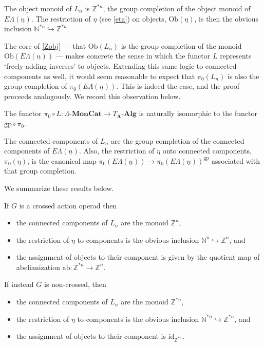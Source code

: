 \documentclass{amsbook} %
\newcommand{\mb}{\mathbf}
\newcommand{\id}{\textrm{id}}
\newcommand{\ML}{\mathbf{\Lambda}}
\newcommand{\ELn}{E\Lambda(\underline{n})}
\newcommand{\lmc}{\Lambda\mbox{-}\mb{MonCat}}
\newcommand{\ab}{\mathrm{ab}}
\newcommand{\gp}{\mathrm{gp}}
\numberwithin{section}{chapter}
\begin{document}
\begin{cor}\label{Zobj}
The object monoid of $L_n$ is $\mathbb{Z}^{*n}$, the group completion of the object monoid of $\ELn$. The restriction of $\eta$ (see \cref{eta}) on objects, $\mathrm{Ob}(\eta)$, is then the obvious inclusion $\mathbb{N}^{*n} \hookrightarrow \mathbb{Z}^{*n}$.
\end{cor}

The core of \cref{Zobj} --- that $\mathrm{Ob}(L_n)$ is the group completion of the monoid $\mathrm{Ob}(\ELn)$ --- makes concrete the sense in which the functor $L$ represents `freely adding inverses' to objects. Extending this same logic to connected components as well, it would seem reasonable to expect that $\pi_0(L_n)$ is also the group completion of $\pi_0(\ELn)$. This is indeed the case, and the proof proceeds analogously. We record this observation below. 

\begin{prop}\label{pilel_gppiel}
The functor $\pi_0 \circ L \colon  \lmc \rightarrow T_{\ML}\mbox{-}\mb{Alg}$ is naturally isomorphic to the functor $\gp \circ \pi_0$.
\end{prop}

\begin{cor}\label{Zconcomp} The connected components of $L_n$ are the group completion of the connected components of $\ELn$. Also, the restriction of $\eta$ onto connected components, $\pi_0(\eta)$, is the canonical map $\pi_0(\ELn) \rightarrow \pi_0(\ELn)^{\gp}$ associated with that group completion.
\end{cor}

We summarize these results below.
\begin{cor}\label{crossconcomp} If $G$ is a crossed action operad then
\begin{itemize} 
\item the connected components of $L_n$ are the monoid $\mathbb{Z}^n$,
\item the restriction of $\eta$ to components is the obvious inclusion $\mathbb{N}^n \hookrightarrow \mathbb{Z}^n$, and
\item the assignment of objects to their component is given by the quotient map of abelianization $\ab \colon  \mathbb{Z}^{\ast n} \rightarrow \mathbb{Z}^n$.
\end{itemize}
If instead $G$ is non-crossed, then
\begin{itemize} \itemsep0em
\item the connected components of $L_n$ are the monoid $\mathbb{Z}^{\ast n}$,
\item the restriction of $\eta$ to components is the obvious inclusion $\mathbb{N}^{\ast n} \hookrightarrow \mathbb{Z}^{\ast n}$, and
\item the assignment of objects to their component is $\id_{\mathbb{Z}^{\ast n}}$.
\end{itemize}
\end{cor}
\end{document}
